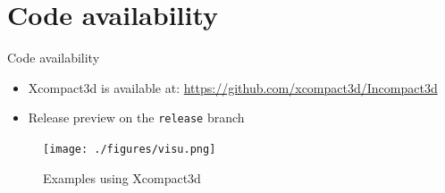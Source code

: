 \documentclass[presentation]{beamer}
\begin{document}
\section{Code availability}
\label{sec:org39d1ae2}

\begin{frame}[label={sec:org6b483db},fragile]{Code availability}
 \begin{itemize}
\item Xcompact3d is available at: \url{https://github.com/xcompact3d/Incompact3d}
\item Release preview on the \texttt{release} branch
\end{itemize}

\begin{figure}[htbp]
\centering
\texttt{[image: ./figures/visu.png]}
\caption{Examples using Xcompact3d}
\end{figure}
\end{frame}
\end{document}
